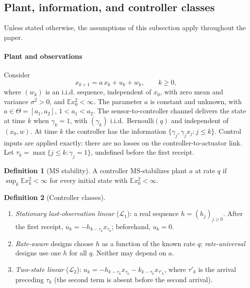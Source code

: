 \documentclass[preprint,12pt,numbers]{elsarticle}
\theoremstyle{definition}
\newtheorem{definition}{Definition}
\newcommand{\E}{\mathbb{E}}
\newcommand{\Lone}{\mathcal{L}_1}
\newcommand{\Ltwo}{\mathcal{L}_2}
\begin{document}
\subsection{Plant, information, and controller classes}\label{sec:setup}
Unless stated otherwise, the assumptions of this subsection apply throughout the paper.
\paragraph{Plant and observations} Consider
\begin{equation}\label{eq:plant}
x_{k+1}=a\,x_k+u_k+w_k,\qquad k\ge0,
\end{equation}
where $(w_k)$ is an i.i.d. sequence, independent of $x_0$, with zero mean and variance $\sigma^2>0$, and $\E x_0^2<\infty$. The parameter $a$ is constant and unknown, with $a\in\Theta=[a_1,a_2]$, $1<a_1<a_2$. The sensor-to-controller channel delivers the state at time $k$ when $\gamma_k=1$, with $(\gamma_k)$ i.i.d.\ Bernoulli$(q)$ and independent of $(x_0,w)$. At time $k$ the controller has the information $\{\gamma_j,\gamma_jx_j:j\le k\}$. Control inputs are applied exactly: there are no losses on the controller-to-actuator link. Let $\tau_k=\max\{j\le k:\gamma_j=1\}$, undefined before the first receipt.

\begin{definition}[MS stability]
A controller MS-stabilizes plant $a$ at rate $q$ if $\sup_k\E x_k^2<\infty$ for every initial state with $\E x_0^2<\infty$.
\end{definition}

\begin{definition}[Controller classes]\label{def:classes}
\begin{enumerate}[label=(\roman*),leftmargin=*,itemsep=1pt]
\item \emph{Stationary last-observation linear} ($\Lone$): a real sequence $h=(h_j)_{j\ge0}$. After the first receipt, $u_k=-h_{k-\tau_k}x_{\tau_k}$; beforehand, $u_k=0$.
\item \emph{Rate-aware} designs choose $h$ as a function of the known rate $q$; \emph{rate-universal} designs use one $h$ for all $q$. Neither may depend on $a$.
\item \emph{Two-state linear} ($\Ltwo$): $u_k=-h_{k-\tau_k}x_{\tau_k}-k_{k-\tau_k}x_{\tau'_k}$, where $\tau'_k$ is the arrival preceding $\tau_k$ (the second term is absent before the second arrival).
\end{enumerate}
\end{definition}
\end{document}
